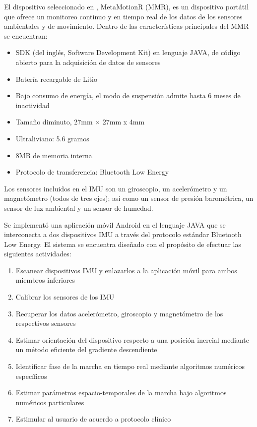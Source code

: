 El dispositivo seleccionado en , MetaMotionR (MMR), es un dispositivo portátil que ofrece un monitoreo continuo y en tiempo real de los datos de los sensores ambientales y de movimiento. Dentro de las características principales del MMR se encuentran:
\begin{itemize}
    \item SDK (del inglés, Software Development Kit) en lenguaje JAVA, de código abierto para la adquisición de datos de sensores
    \item Batería recargable de Litio
    \item Bajo consumo de energía, el modo de suspensión admite hasta 6 meses de inactividad
    \item Tamaño diminuto, 27mm × 27mm x 4mm
    \item Ultraliviano: 5.6 gramos
    \item 8MB de memoria interna
    \item Protocolo de transferencia: Bluetooth Low Energy 
\end{itemize}

Los sensores incluidos en el IMU son un giroscopio, un acelerómetro y un magnetómetro (todos de tres ejes); así como un sensor de presión barométrica, un sensor de luz ambiental y un sensor de humedad.

Se implementó una aplicación móvil Android en el lenguaje JAVA que se interconecta a dos dispositivos IMU a través del protocolo estándar Bluetooth Low Energy. El sistema se encuentra diseñado con el propósito de efectuar las siguientes actividades:

\begin{enumerate}
    \item Escanear dispositivos IMU y enlazarlos a la aplicación móvil para ambos miembros inferiores
    \item Calibrar los sensores de los IMU
    \item Recuperar los datos acelerómetro, giroscopio y magnetómetro de los respectivos sensores
    \item Estimar orientación del dispositivo respecto a una posición inercial mediante un método eficiente del gradiente descendiente 
    \item Identificar fase de la marcha en tiempo real mediante algoritmos numéricos específicos
    \item Estimar parámetros espacio-temporales de la marcha bajo algoritmos numéricos particulares
    \item Estimular al usuario de acuerdo a protocolo clínico
\end{enumerate}

